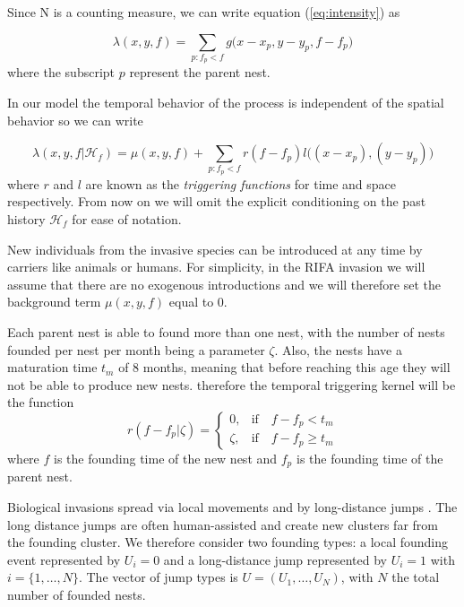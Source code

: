 \documentclass{article}
\begin{document}
Since N is a counting measure, we can write equation (\ref{eq:intensity}) as

\begin{equation*}
    \lambda(x, y, f) = \sum_{ p: f_p < f } g \Big(x - x_p, y - y_p, f - f_p \Big)
\end{equation*}
where the subscript $p$ represent the parent nest.

In our model the temporal behavior of the process is independent of the spatial behavior so we can write

\begin{equation*}
    \lambda(x, y, f | \mathcal{H}_f) = \mu(x, y, f) + \sum_{ p: f_p < f } r(f-f_p) l\Big((x - x_p), (y - y_p)\Big)
\end{equation*}
where $r$ and $l$ are known as the {\em triggering functions} for time and space respectively. From now on we will omit the explicit conditioning on the past history $\mathcal{H}_f$ for ease of notation.

New individuals from the invasive species can be introduced at any time by carriers like animals or humans. For simplicity, in the RIFA invasion we will assume that there are no exogenous introductions and we will therefore set the background term $\mu(x, y, f) $ equal to 0.

Each parent nest is able to found more than one nest, with the number of nests founded per nest per month being a parameter $\zeta$. Also, the nests have a maturation time $t_m$ of 8 months, meaning that before reaching this age they will not be able to produce new nests. therefore the temporal triggering kernel will be the function
{\color{red}
\begin{equation*}
    r (f - f_p | \zeta) =
    \begin{cases}
        0, & \mbox{if} \quad f - f_p < t_{m} \\
        \zeta, & \mbox{if} \quad f - f_p \geq t_{m}
    \end{cases}
\end{equation*}}
where $f$ is the founding time of the new nest and $f_p$ is the founding time of the parent nest.

Biological invasions spread via local movements and by long-distance jumps \cite{Suarez}. The long distance jumps are often human-assisted and create new clusters far from the founding cluster. We therefore consider two founding types: a local founding event represented by $U_i = 0$ and a long-distance jump represented by $U_i = 1$ with $i=\{1, \dots, N\}$. The vector of jump types is $U = (U_1, \dots, U_N)$, with $N$ the total number of founded nests.
\end{document}
